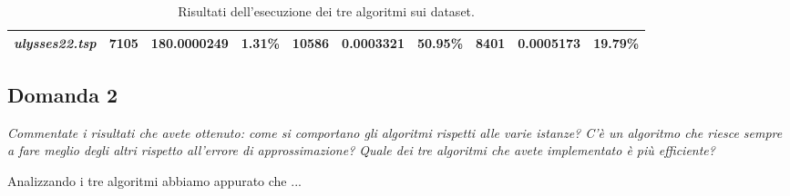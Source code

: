 \begin{landscape}
\begin{table}[]
\begin{tabular}{|l|l|l|l|l|l|l|l|l|l|}
  \textit{ulysses22.tsp}                                  & 7105                                    & 180.0000249                                                                           & 1.31\%                                                                                  & 10586                                   & 0.0003321                                                                              & 50.95\%                                                                                 & 8401                                    & 0.0005173                                                                             & 19.79\%                                                                                 \\ \hline
  \end{tabular}
  \caption{Risultati dell'esecuzione dei tre algoritmi sui dataset.}
  \label{tab:results}
  \end{table}
\end{landscape}


\subsection{Domanda 2}
\textit{Commentate i risultati che avete ottenuto: come si comportano gli algoritmi rispetti alle varie istanze?
C'è un algoritmo che riesce sempre a fare meglio degli altri rispetto all'errore di approssimazione? Quale dei tre
algoritmi che avete implementato è più efficiente?}


Analizzando i tre algoritmi abbiamo appurato che ...